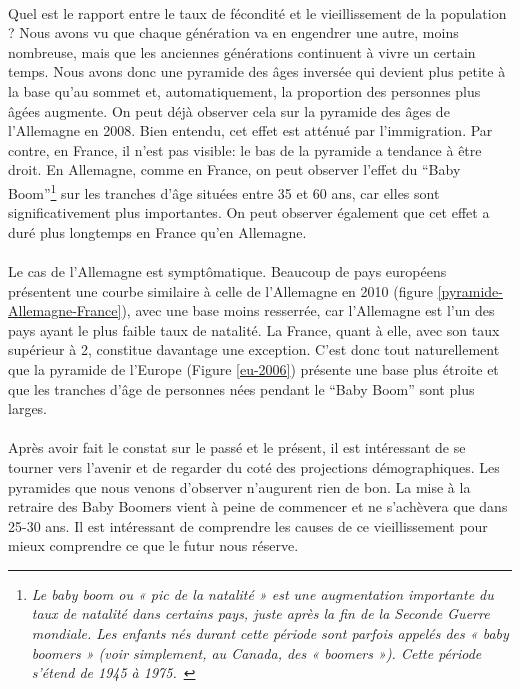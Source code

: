 \paragraph{}Quel est le rapport entre le taux de fécondité et le vieillissement de la population ? Nous avons vu que chaque génération va en engendrer une autre, moins nombreuse, mais que les anciennes générations continuent à vivre un certain temps. Nous avons donc une pyramide des âges inversée qui devient plus petite à la base qu’au sommet et, automatiquement, la proportion des personnes plus âgées augmente. On peut déjà observer cela sur la pyramide des âges de l’Allemagne en 2008. Bien entendu, cet effet est atténué par l’immigration. Par contre, en France, il n’est pas visible: le bas de la pyramide a tendance à être droit.  En Allemagne, comme en France, on peut observer l’effet du “Baby Boom”\footnote{\textit{Le baby boom ou « pic de la natalité » est une augmentation importante du taux de natalité dans certains pays, juste après la fin de la Seconde Guerre mondiale. Les enfants nés durant cette période sont parfois appelés des « baby boomers » (voir simplement, au Canada, des « boomers »). Cette période s'étend de 1945 à 1975.}~\citep{baby-boom}} sur les tranches d'âge situées entre 35 et 60 ans, car elles sont significativement plus importantes. On peut observer également que cet effet a duré plus longtemps en France qu'en Allemagne.

\paragraph{}Le cas de l’Allemagne est symptômatique. Beaucoup de pays européens présentent une courbe similaire à celle de l’Allemagne en 2010 (figure \ref{pyramide-Allemagne-France}), avec une base moins resserrée, car l’Allemagne est l'un des pays ayant le plus faible taux de natalité. La France, quant à elle, avec son taux supérieur à 2, constitue davantage une exception. C’est donc tout naturellement que la pyramide de l’Europe (Figure \ref{eu-2006}) présente une base plus étroite et que les tranches d'âge de personnes nées pendant le “Baby Boom” sont plus larges. 

\paragraph{}Après avoir fait le constat sur le passé et le présent, il est intéressant de se tourner vers l’avenir et de regarder du coté des projections démographiques. Les pyramides que nous venons d’observer n’augurent rien de bon. La mise à la retraire des Baby Boomers vient à peine de commencer et ne s’achèvera que dans 25-30 ans. Il est intéressant de comprendre les causes de ce vieillissement pour mieux comprendre ce que le futur nous réserve. 

